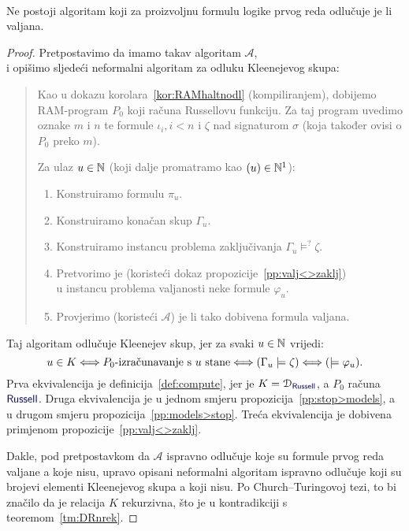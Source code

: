 \begin{teorem}\label{tm:Church}\ \\
Ne postoji algoritam koji za proizvoljnu formulu logike prvog reda odlučuje je li valjana.
\end{teorem}
\begin{proof}
Pretpostavimo da imamo takav algoritam $\mathcal A$,\\ i opišimo sljedeći neformalni algoritam za odluku Kleenejevog skupa:
\begin{quote}
Kao u dokazu korolara~\ref{kor:RAMhaltnodl} (kompiliranjem), dobijemo RAM-program $P_0$ koji računa Russellovu funkciju. Za taj program uvedimo oznake $m$ i $n$ te formule $\iota_i,i<n$ i $\zeta$ nad signaturom $\sigma$ (koja također ovisi o $P_0$ preko $m$).

Za ulaz $u\in{\mathbb N}$ (koji dalje promatramo kao $(u)\in{\mathbb N}^1$):
\begin{enumerate}
    \item Konstruiramo formulu $\pi_u$.
    \item Konstruiramo konačan skup $\Gamma_u$.
    \item Konstruiramo instancu problema zaključivanja $\Gamma_u%
    \models^?
    \zeta$.
    \item\label{step:varphi_u} Pretvorimo je (koristeći dokaz propozicije~\ref{pp:valj<>zaklj})\\ u instancu problema valjanosti neke formule $\varphi_u$.
    \item Provjerimo (koristeći $\mathcal A$) je li tako dobivena formula valjana.
\end{enumerate}
\end{quote}
Taj algoritam odlučuje Kleenejev skup, jer za svaki $u\in{\mathbb N}$ vrijedi:%
\begin{equation}\label{eq:lanaceqv}
    u\in K\Longleftrightarrow\text{$P_0$-izračunavanje s $u$ stane}\Longleftrightarrow(\Gamma_u\models\zeta)\Longleftrightarrow{}(\models\varphi_u)\text.
\end{equation}
Prva ekvivalencija je definicija~\ref{def:compute}, jer je $K=\dom{\f{Russell}}$, a $P_0$ računa $\f{Russell}$. Druga ekvivalencija je u jednom smjeru propozicija~\ref{pp:stop>models}, a u drugom smjeru propozicija~\ref{pp:models>stop}. Treća ekvivalencija je dobivena primjenom propozicije~\ref{pp:valj<>zaklj}.

Dakle, pod pretpostavkom da $\mathcal A$ ispravno odlučuje koje su formule prvog reda valjane a koje nisu, upravo opisani neformalni algoritam ispravno odlučuje koji su brojevi elementi Kleenejevog skupa a koji nisu. Po Church--\!Turingovoj tezi, to bi značilo da je relacija $K$ rekurzivna, što je u kontradikciji s teoremom~\ref{tm:DRnrek}.
\end{proof}

